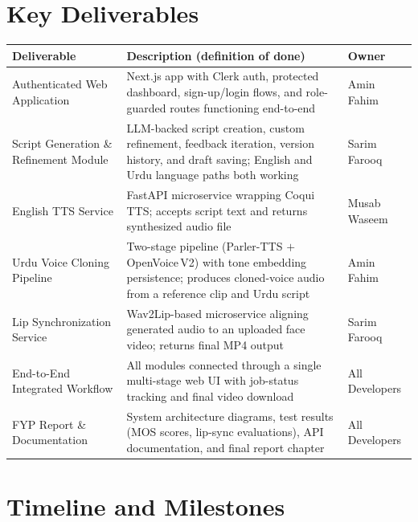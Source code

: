 ﻿\documentclass[12pt, a4paper]{article}
\newcommand{\thead}[1]{\cellcolor{headerbg}\textcolor{headertext}{\textbf{#1}}}
\newcommand{\talt}{\rowcolor{rowalt}}
\begin{document}
\section{Key Deliverables}

\begin{tabular}{>{\raggedright\arraybackslash}p{3.6cm}
                >{\raggedright\arraybackslash}p{8.0cm}
                >{\raggedright\arraybackslash}p{2.4cm}}
  \toprule
  \thead{Deliverable} & \thead{Description (definition of done)} & \thead{Owner} \\
  \midrule
  Authenticated Web Application
    & Next.js app with Clerk auth, protected dashboard, sign-up/login flows,
      and role-guarded routes functioning end-to-end
    & Amin Fahim \\
  \talt
  Script Generation \& Refinement Module
    & LLM-backed script creation, custom refinement, feedback iteration, version
      history, and draft saving; English and Urdu language paths both working
    & Sarim Farooq \\
  English TTS Service
    & FastAPI microservice wrapping Coqui\,TTS; accepts script text and returns
      synthesized audio file
    & Musab Waseem \\
  \talt
  Urdu Voice Cloning Pipeline
    & Two-stage pipeline (Parler-TTS $+$ OpenVoice\,V2) with tone embedding
      persistence; produces cloned-voice audio from a reference clip and Urdu script
    & Amin Fahim \\
  Lip Synchronization Service
    & Wav2Lip-based microservice aligning generated audio to an uploaded face
      video; returns final MP4 output
    & Sarim Farooq \\
  \talt
  End-to-End Integrated Workflow
    & All modules connected through a single multi-stage web UI with job-status
      tracking and final video download
    & All Developers \\
  FYP Report \& Documentation
    & System architecture diagrams, test results (MOS scores, lip-sync
      evaluations), API documentation, and final report chapter
    & All Developers \\
  \bottomrule
\end{tabular}

\section{Timeline and Milestones}
\end{document}
